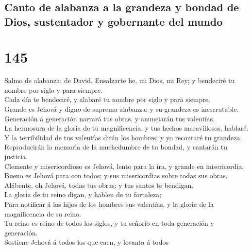 \hypertarget{canto-de-alabanza-a-la-grandeza-y-bondad-de-dios-sustentador-y-gobernante-del-mundo}{%
\subsection{Canto de alabanza a la grandeza y bondad de Dios,
sustentador y gobernante del
mundo}\label{canto-de-alabanza-a-la-grandeza-y-bondad-de-dios-sustentador-y-gobernante-del-mundo}}

\hypertarget{section-144}{%
\section{145}\label{section-144}}

 Salmo de alabanza: de David. Ensalzarte he, mi Dios, mi
Rey; y bendeciré tu nombre por siglo y para siempre.\\
 Cada día te bendeciré, y alabaré tu nombre por siglo y
para siempre.\\
 Grande es Jehová y digno de suprema alabanza: y su
grandeza es inescrutable.\\
 Generación á generación narrará tus obras, y anunciarán
tus valentías.\\
 La hermosura de la gloria de tu magnificencia, y tus
hechos maravillosos, hablaré.\\
 Y la terribilidad de tus valentías dirán los hombres; y
yo recontaré tu grandeza.\\
 Reproducirán la memoria de la muchedumbre de tu bondad, y
cantarán tu justicia.\\
 Clemente y misericordioso es Jehová, lento para la ira, y
grande en misericordia.\\
 Bueno es Jehová para con todos; y sus misericordias sobre
todas sus obras.\\
 Alábente, oh Jehová, todas tus obras; y tus santos te
bendigan.\\
 La gloria de tu reino digan, y hablen de tu fortaleza;\\
 Para notificar á los hijos de los hombres sus valentías,
y la gloria de la magnificencia de su reino.\\
 Tu reino es reino de todos los siglos, y tu señorío en
toda generación y generación.\\
 Sostiene Jehová á todos los que caen, y levanta á todos
